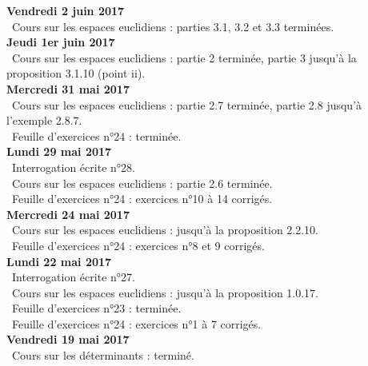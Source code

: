 \documentclass[12pt,a4paper]{article}
\begin{document}
\noindent\textbf{Vendredi 2 juin 2017}\\
\bu\ Cours sur les espaces euclidiens : parties 3.1, 3.2 et 3.3 terminées.\vspace{.4cm}\\

\noindent\textbf{Jeudi 1er juin 2017}\\
\bu\ Cours sur les espaces euclidiens : partie 2 terminée, partie 3 jusqu'à la proposition 3.1.10 (point ii).\vspace{.4cm}\\

\noindent\textbf{Mercredi 31 mai 2017}\\
\bu\ Cours sur les espaces euclidiens : partie 2.7 terminée, partie 2.8 jusqu'à l'exemple 2.8.7.\\
\bu\ Feuille d'exercices n°24 : terminée.\vspace{.4cm}\\

\noindent\textbf{Lundi 29 mai 2017}\\
\bu\ Interrogation écrite n°28.\\
\bu\ Cours sur les espaces euclidiens : partie 2.6 terminée.\\
\bu\ Feuille d'exercices n°24 : exercices n°10 à 14 corrigés.\vspace{.4cm}\\

\noindent\textbf{Mercredi 24 mai 2017}\\
\bu\ Cours sur les espaces euclidiens : jusqu'à la proposition 2.2.10.\\
\bu\ Feuille d'exercices n°24 : exercices n°8 et 9 corrigés.\vspace{.4cm}\\

\noindent\textbf{Lundi 22 mai 2017}\\
\bu\ Interrogation écrite n°27. \\
\bu\ Cours sur les espaces euclidiens : jusqu'à la proposition 1.0.17.\\
\bu\ Feuille d'exercices n°23 : terminée.\\
\bu\ Feuille d'exercices n°24 : exercices n°1 à 7 corrigés.\vspace{.4cm}\\

\noindent\textbf{Vendredi 19  mai 2017}\\
\bu\ Cours sur les déterminants : terminé.\vspace{.4cm}\\
\end{document}
